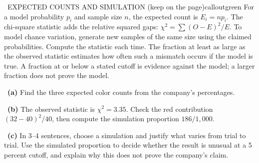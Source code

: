\documentclass[11pt]{article}
\begin{document}
\begin{callout}{\IconBook\ EXPECTED COUNTS AND SIMULATION (keep on the page)}{calloutgreen}
For a model probability $p_i$ and sample size $n$, the expected count is $E_i=np_i$.
The chi-square statistic adds the relative squared gaps: $\chi^2=\sum (O-E)^2/E$.
To model chance variation, generate new samples of the same size using the claimed probabilities.
Compute the statistic each time. The fraction at least as large as the observed statistic estimates
how often such a mismatch occurs if the model is true. A fraction at or below a stated cutoff is
evidence against the model; a larger fraction does not prove the model.
\end{callout}

~\textbf{(a)} Find the three expected color counts from the company's percentages.\par
{}

~\textbf{(b)} The observed statistic is $\chi^2=3.35$. Check the red contribution $(32-40)^2/40$, then compute the simulation proportion $186/1{,}000$.\par
{}

~\textbf{(c)} In 3--4 sentences, choose a simulation and justify what varies from trial to trial. Use the simulated proportion to decide whether the result is unusual at a 5 percent cutoff, and explain why this does not prove the company's claim.\par
{}
\end{document}
